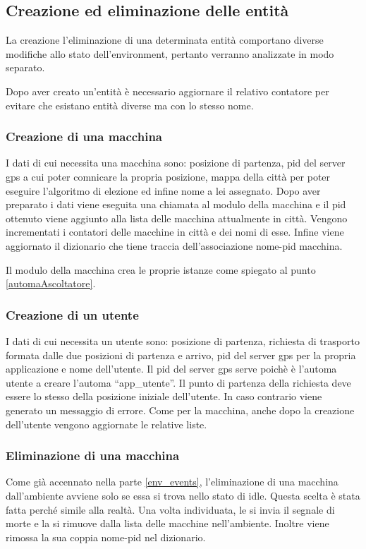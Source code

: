 \subsection{Creazione ed eliminazione delle entità} \label{creazione_distruzione_entita}
La creazione l'eliminazione di una determinata entità comportano diverse modifiche allo stato dell'environment, pertanto verranno analizzate in modo separato.

Dopo aver creato un'entità è necessario aggiornare il relativo contatore per evitare che esistano entità diverse ma con lo stesso nome.

\subsubsection{Creazione di una macchina}
I dati di cui necessita una macchina sono: posizione di partenza, pid del server gps a cui poter comnicare la propria posizione, mappa della città per poter eseguire l'algoritmo di elezione ed infine nome a lei assegnato. Dopo aver preparato i dati viene eseguita una chiamata al modulo della macchina e il pid ottenuto viene aggiunto alla lista delle macchina attualmente in città. Vengono incrementati i contatori delle macchine in città e dei nomi di esse. Infine viene aggiornato il dizionario che tiene traccia dell'associazione nome-pid macchina.

Il modulo della macchina crea le proprie istanze come spiegato al punto \ref{automaAscoltatore}.

\subsubsection{Creazione di un utente}
I dati di cui necessita un utente sono: posizione di partenza, richiesta di trasporto formata dalle due posizioni di partenza e arrivo, pid del server gps per la propria applicazione e nome dell'utente. Il pid del server gps serve poichè è l'automa utente a creare l'automa ``app\_utente''. Il punto di partenza della richiesta deve essere lo stesso della posizione iniziale dell'utente. In caso contrario viene generato un messaggio di errore. Come per la macchina, anche dopo la creazione dell'utente vengono aggiornate le relative liste.

\subsubsection{Eliminazione di una macchina}
Come già accennato nella parte \ref{env_events}, l'eliminazione di una macchina dall'ambiente avviene solo se essa si trova nello stato di idle. Questa scelta è stata fatta perché simile alla realtà. Una volta individuata, le si invia il segnale di morte e la si rimuove dalla lista delle macchine nell'ambiente. Inoltre viene rimossa la sua coppia nome-pid nel dizionario.

